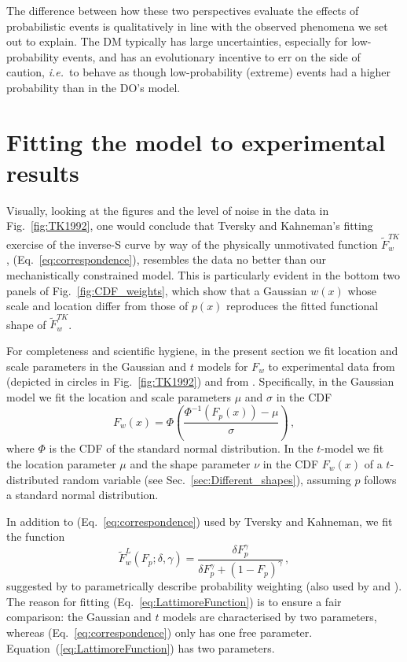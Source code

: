 \documentclass[a4paper, 12pt]{article}
\newcommand{\elabel}[1]{\label{eq:#1}}
\newcommand{\eref}[1]{(Eq.~\ref{eq:#1})}
\newcommand{\Eref}[1]{Equation~(\ref{eq:#1})}
\newcommand{\fref}[1]{Fig.~\ref{fig:#1}}
\newcommand{\seclabel}[1]{\label{sec:#1}}
\newcommand{\secref}[1]{Sec.~\ref{sec:#1}}
\newcommand{\ie}{{\it i.e.}\ }
\newcommand{\be}{\begin{equation}}
\newcommand{\ee}{\end{equation}}
\begin{document}
The difference between how these two perspectives evaluate the effects of probabilistic events is qualitatively in line with the observed phenomena we set out to explain. The DM typically has large uncertainties, especially for low-probability events, and has an evolutionary incentive to err on the side of caution, \ie to behave as though low-probability (extreme) events had a higher probability than in the DO's model.


\section{Fitting the model to experimental results \seclabel{Fitting_the}}

Visually, looking at the figures and the level of noise in the data in \fref{TK1992}, one would conclude that Tversky and Kahneman's fitting exercise of the inverse-S curve by way of the physically unmotivated function $\tilde{F}^{TK}_w$, \eref{correspondence}, resembles the data no better than our mechanistically constrained model. This is particularly evident in the bottom two panels of \fref{CDF_weights}, which show that a Gaussian $w(x)$ whose scale and location differ from those of $p(x)$ reproduces the fitted functional shape of $\tilde{F}^{TK}_w$.

For completeness and scientific hygiene, in the present section we fit location and scale parameters in the Gaussian and $t$ models for $F_w$ to experimental data from \cite{TverskyKahneman1992} (depicted in circles in \fref{TK1992}) and from \cite{TverskyFox1995}. Specifically, in the Gaussian model we fit the location and scale parameters $\mu$ and $\sigma$ in the CDF
%
\be
F_w\left(x\right) = \Phi\left(\frac{\Phi^{-1}\left(F_p\left(x\right)\right) - \mu}{\sigma}\right)\,,
\ee
%
where $\Phi$ is the CDF of the standard normal distribution. In the $t$-model we fit the location parameter $\mu$ and the shape parameter $\nu$ in the CDF $F_w\left(x\right)$ of a $t$-distributed random variable (see \secref{Different_shapes}), assuming $p$ follows a standard normal distribution.


In addition to \eref{correspondence} used by Tversky and Kahneman, we fit the function
%
\be
\tilde{F}^{L}_w\left(F_p; \delta,\gamma\right) =\frac{\delta F_p^{\gamma}}{\delta F_p^{\gamma} + \left(1-F_p\right)^{\gamma}}\,,
\elabel{LattimoreFunction}
\ee
%
suggested by \cite{LattimoreBakerWitte1992} to parametrically describe probability weighting (also used by \cite{tversky1995risk} and \cite{Prelec1998}). The reason for fitting \eref{LattimoreFunction} is to ensure a fair comparison: the Gaussian and $t$ models are characterised by two parameters, whereas \eref{correspondence} only has one free parameter. \Eref{LattimoreFunction} has two parameters.
\end{document}
